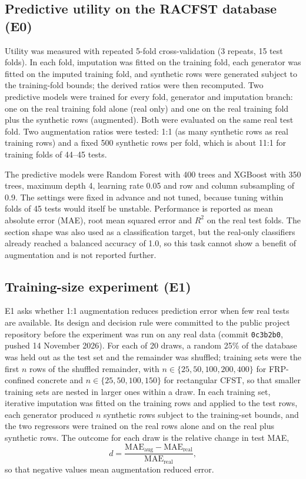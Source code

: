 \documentclass[pdflatex,sn-basic]{sn-jnl}
\begin{document}
\subsection{Predictive utility on the RACFST database (E0)}\label{sec:e0}
Utility was measured with repeated 5-fold cross-validation (3 repeats, 15 test folds). In each fold, imputation
was fitted on the training fold, each generator was fitted on the imputed training fold, and synthetic rows were
generated subject to the training-fold bounds; the derived ratios were then recomputed. Two predictive models were
trained for every fold, generator and imputation branch: one on the real training fold alone (real only) and one
on the real training fold plus the synthetic rows (augmented). Both were evaluated on the same real test fold. Two
augmentation ratios were tested: 1:1 (as many synthetic rows as real training rows) and a fixed 500 synthetic rows
per fold, which is about 11:1 for training folds of 44--45 tests.

The predictive models were Random Forest \citep{breiman2001rf} with 400 trees and XGBoost \citep{chen2016xgboost}
with 350 trees, maximum depth 4, learning rate 0.05 and row and column subsampling of 0.9. The settings were fixed
in advance and not tuned, because tuning within folds of 45 tests would itself be unstable. Performance is
reported as mean absolute error (MAE), root mean squared error and $R^2$ on the real test folds. The section shape
was also used as a classification target, but the real-only classifiers already reached a balanced accuracy of
1.0, so this task cannot show a benefit of augmentation and is not reported further.

\subsection{Training-size experiment (E1)}\label{sec:e1}
E1 asks whether 1:1 augmentation reduces prediction error when few real tests are available. Its design and
decision rule were committed to the public project repository before the experiment was run on any real data
(commit \texttt{0c3b2b0}, pushed 14 November 2026). For each of 20 draws, a random 25\% of the database was held
out as the test set and the remainder was shuffled; training sets were the first $n$ rows of the shuffled
remainder, with $n \in \{25, 50, 100, 200, 400\}$ for FRP-confined concrete and $n \in \{25, 50, 100, 150\}$ for
rectangular CFST, so that smaller training sets are nested in larger ones within a draw. In each training set,
iterative imputation was fitted on the training rows and applied to the test rows, each generator produced $n$
synthetic rows subject to the training-set bounds, and the two regressors were trained on the real rows alone and
on the real plus synthetic rows. The outcome for each draw is the relative change in test MAE,
\begin{equation}
d = \frac{\mathrm{MAE}_\mathrm{aug} - \mathrm{MAE}_\mathrm{real}}{\mathrm{MAE}_\mathrm{real}},
\end{equation}
so that negative values mean augmentation reduced error.
\end{document}

